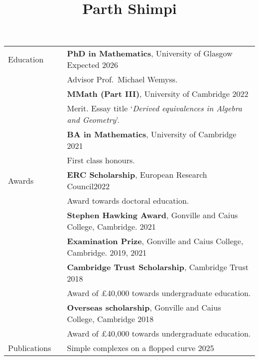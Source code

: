 \documentclass[10pt]{article}
\newcommand{\nextItem}{\\[0.25em]}
\newcommand{\nextSection}{\\[0.5em]}
\begin{document}
\title{Parth Shimpi\normalsize{}
    \raisebox{-0.1em}{\huge\(\vert\)}
    }
%
\date{}
\maketitle
\thispagestyle{fancy}
\vspace{-5.5em}
\begin{longtable}{>{\raggedleft\arraybackslash}p{0.8in}>{}p{0.05in}>{}p{5.7in}}
    Education%
        && \textbf{PhD in Mathematics},
           University of Glasgow
           \hfill Expected 2026 \\
        && Advisor Prof.\ Michael Wemyss. \nextItem
        && \textbf{MMath (Part III)},
           University of Cambridge
           \hfill 2022\\
        && Merit. Essay title `\emph{Derived equivalences in Algebra and
        Geometry}'.
        \nextItem
        && \textbf{BA in Mathematics},
           University of Cambridge
           \hfill 2021\\
        && First class honours.
        \nextSection
    Awards%
        && \textbf{ERC Scholarship}, European Research Council\hfill 2022\\
        && Award towards doctoral education. \nextItem
        && \textbf{Stephen Hawking Award}, Gonville and Caius College,
        Cambridge. \hfill 2021\nextItem
        && \textbf{Examination Prize}, Gonville and Caius College, Cambridge.
        \hfill 2019, 2021\nextItem
        && \textbf{Cambridge Trust Scholarship}, Cambridge Trust \hfill 2018\\
        && Award of £40,000 towards undergraduate education. \nextItem
        && \textbf{Overseas scholarship}, Gonville and Caius College, Cambridge \hfill 2018\\
        && Award of £40,000 towards undergraduate education. \nextSection
    Publications%
        && Simple complexes on a flopped curve \hfill 2025\\

\end{longtable}
\end{document}
